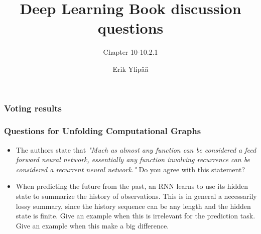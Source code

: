 \documentclass{beamer}
\title[DLB 10-10.2.1] %
{Deep Learning Book discussion questions}
\subtitle{Chapter 10-10.2.1}
\author[Author, Erik] %
{Erik Ylipää\inst{1}}
\institute[RISE] %
{
  \inst{1}%
  Research Institutes of Sweden
}
\begin{document}
\frame{\titlepage}


  \begin{frame}
    \frametitle{Voting results}
  \end{frame}

\begin{frame}
  \frametitle{Questions for Unfolding Computational Graphs}
\begin{itemize}
  \item The authors state that \textit{"Much as almost any function can be considered a feed forward neural network, essentially any function involving recurrence can be considered a recurrent neural network."} Do you agree with this statement?

  \item When predicting the future from the past, an RNN learns to use its hidden state to summarize the history of observations. This is in general a necessarily lossy summary, since the history sequence can be any length and the hidden state is finite. Give an example when this is irrelevant for the prediction task. Give an example when this make a big difference.
    \end{itemize}
\end{frame}
\end{document}
